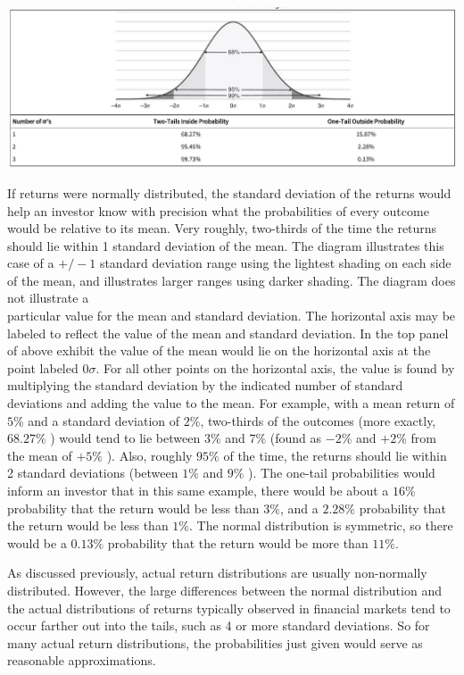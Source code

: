 \documentclass[11pt]{article}
\begin{document}
\begin{center}
\includegraphics[max width=\textwidth]{2024_04_10_e31febb808c589fc558dg-2}
\end{center}

If returns were normally distributed, the standard deviation of the returns would help an investor know with precision what the probabilities of every outcome would be relative to its mean. Very roughly, two-thirds of the time the returns should lie within 1 standard deviation of the mean. The diagram illustrates this case of a $+/-1$ standard deviation range using the lightest shading on each side of the mean, and illustrates larger ranges using darker shading. The diagram does not illustrate a\\
particular value for the mean and standard deviation. The horizontal axis may be labeled to reflect the value of the mean and standard deviation. In the top panel of above exhibit the value of the mean would lie on the horizontal axis at the point labeled $0 \sigma$. For all other points on the horizontal axis, the value is found by multiplying the standard deviation by the indicated number of standard deviations and adding the value to the mean. For example, with a mean return of $5 \%$ and a standard deviation of $2 \%$, two-thirds of the outcomes (more exactly, $68.27 \%$ ) would tend to lie between $3 \%$ and $7 \%$ (found as $-2 \%$ and $+2 \%$ from the mean of $+5 \%$ ). Also, roughly $95 \%$ of the time, the returns should lie within 2 standard deviations (between $1 \%$ and $9 \%$ ). The one-tail probabilities would inform an investor that in this same example, there would be about a $16 \%$ probability that the return would be less than $3 \%$, and a $2.28 \%$ probability that the return would be less than $1 \%$. The normal distribution is symmetric, so there would be a $0.13 \%$ probability that the return would be more than $11 \%$.

As discussed previously, actual return distributions are usually non-normally distributed. However, the large differences between the normal distribution and the actual distributions of returns typically observed in financial markets tend to occur farther out into the tails, such as 4 or more standard deviations. So for many actual return distributions, the probabilities just given would serve as reasonable approximations.
\end{document}
